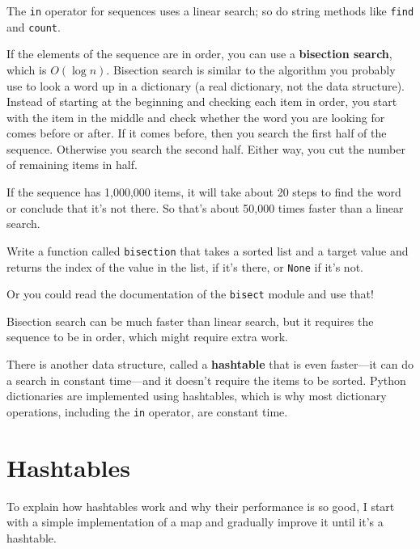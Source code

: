 \documentclass[10pt]{book}
\begin{document}
The {\tt in} operator for sequences uses a linear search; so do string
methods like {\tt find} and {\tt count}.

If the elements of the sequence are in order, you can use a {\bf
  bisection search}, which is $O(\log n)$.  Bisection search is
similar to the algorithm you probably use to look a word up in a
dictionary (a real dictionary, not the data structure).  Instead of starting at
the beginning and checking each item in order, you start with the item
in the middle and check whether the word you are looking for comes
before or after.  If it comes before, then you search the first half
of the sequence.  Otherwise you search the second half.  Either way,
you cut the number of remaining items in half.  

If the sequence has 1,000,000 items, it will take about 20 steps to
find the word or conclude that it's not there.  So that's about 50,000
times faster than a linear search.

\begin{exercise}

Write a function called {\tt bisection} that takes a sorted list
and a target value and returns the index of the value
in the list, if it's there, or {\tt None} if it's not.


Or you could read the documentation of the {\tt bisect} module
and use that!

\end{exercise}

Bisection search can be much faster than linear search, but
it requires the sequence to be in order, which might require
extra work.

There is another data structure, called a {\bf hashtable} that
is even faster---it can do a search in constant time---and it
doesn't require the items to be sorted.  Python dictionaries
are implemented using hashtables, which is why most dictionary
operations, including the {\tt in} operator, are constant time.


\section{Hashtables}
\label{hashtable}

To explain how hashtables work and why their performance is so
good, I start with a simple implementation of a map and
gradually improve it until it's a hashtable.
\end{document}
